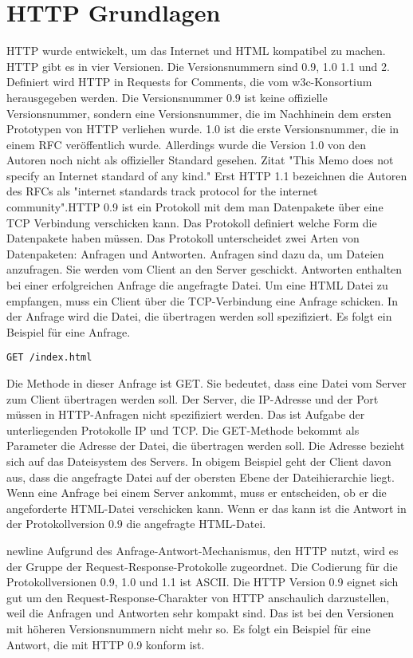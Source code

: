 \documentclass{llncs}
\begin{document}
\section{HTTP Grundlagen}
HTTP wurde entwickelt, um das Internet und HTML kompatibel zu machen. HTTP gibt es in vier Versionen. Die Versionsnummern sind 0.9, 1.0 1.1 und 2. Definiert wird HTTP in Requests for Comments, die vom w3c-Konsortium herausgegeben werden. Die Versionsnummer 0.9 ist keine offizielle Versionsnummer, sondern eine Versionsnummer, die im Nachhinein dem ersten Prototypen von HTTP verliehen wurde. 1.0 ist die erste Versionsnummer, die in einem RFC veröffentlich wurde. Allerdings wurde die Version 1.0 von den Autoren noch nicht als offizieller Standard gesehen. Zitat "This Memo does not specify an Internet standard of any kind." Erst HTTP 1.1 bezeichnen die Autoren des RFCs als "internet standards track protocol for the internet community".\newline HTTP 0.9 ist ein Protokoll mit dem man Datenpakete über eine TCP Verbindung verschicken kann. Das Protokoll definiert welche Form die Datenpakete haben müssen. Das Protokoll unterscheidet zwei Arten von Datenpaketen: Anfragen und Antworten. Anfragen sind dazu da, um Dateien anzufragen. Sie werden vom Client an den Server geschickt. Antworten enthalten bei einer erfolgreichen Anfrage die angefragte Datei. Um eine HTML Datei zu empfangen, muss ein Client über die TCP-Verbindung eine Anfrage schicken. In der Anfrage wird die Datei, die übertragen werden soll spezifiziert. Es folgt ein Beispiel für eine Anfrage. 
\begin{verbatim}
GET /index.html
\end{verbatim}
Die Methode in dieser Anfrage ist GET. Sie bedeutet, dass eine Datei vom Server zum Client übertragen werden soll. Der Server, die IP-Adresse und der Port müssen in HTTP-Anfragen nicht spezifiziert werden. Das ist Aufgabe der unterliegenden Protokolle IP und TCP. Die GET-Methode bekommt als Parameter die Adresse der Datei, die übertragen werden soll. Die Adresse bezieht sich auf das Dateisystem des Servers. In obigem Beispiel geht der Client davon aus, dass die angefragte Datei auf der obersten Ebene der Dateihierarchie liegt.\newline
Wenn eine Anfrage bei einem Server ankommt, muss er entscheiden, ob er die angeforderte HTML-Datei verschicken kann. Wenn er das kann ist die Antwort in der Protokollversion 0.9 die angefragte HTML-Datei. \begin{center}\end{center}newline Aufgrund des Anfrage-Antwort-Mechanismus, den HTTP nutzt, wird es der Gruppe der Request-Response-Protokolle zugeordnet. Die Codierung für die Protokollversionen 0.9, 1.0 und 1.1 ist ASCII. Die HTTP Version 0.9 eignet sich gut um den Request-Response-Charakter von HTTP anschaulich darzustellen, weil die Anfragen und Antworten sehr kompakt sind. Das ist bei den Versionen mit höheren Versionsnummern nicht mehr so. Es folgt ein Beispiel für eine Antwort, die mit HTTP 0.9 konform ist.
\end{document}
